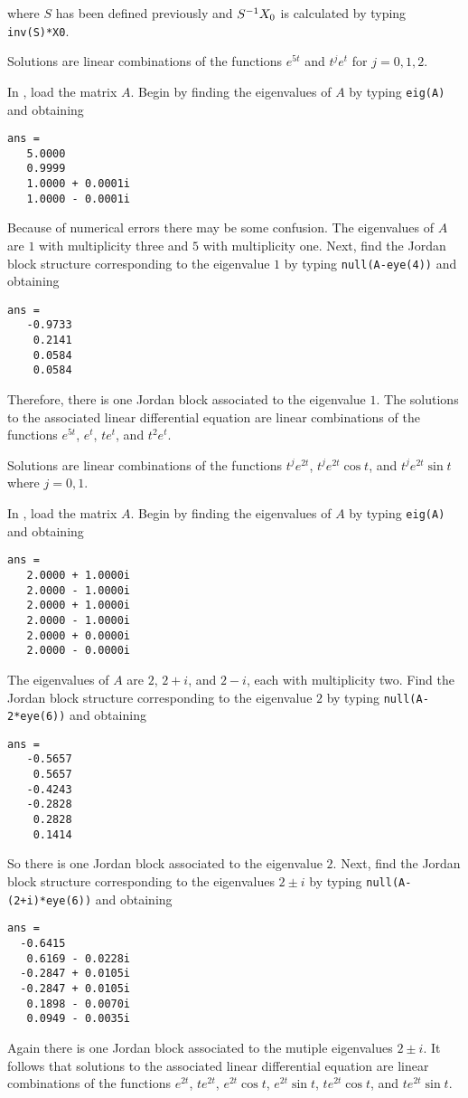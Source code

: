 where $S$ has been defined previously and $S^{-1} X_0$ is calculated by typing 
{\tt inv(S)*X0}.


 \ans Solutions are linear combinations of the functions 
$e^{5t}$ and $t^je^t$ for $j=0,1,2$.

\soln In \Matlabp, load the matrix $A$.  Begin by 
finding the eigenvalues of $A$ by typing {\tt eig(A)} and obtaining
\begin{verbatim}
ans =
   5.0000          
   0.9999          
   1.0000 + 0.0001i
   1.0000 - 0.0001i
\end{verbatim}
Because of numerical errors there may be some confusion.  The eigenvalues of
$A$ are $1$ with multiplicity three and $5$ with multiplicity one.  Next,
find the Jordan block structure corresponding to the eigenvalue $1$ by typing
{\tt null(A-eye(4))} and obtaining
\begin{verbatim}
ans =
   -0.9733
    0.2141
    0.0584
    0.0584
\end{verbatim}
Therefore, there is one Jordan block associated to the eigenvalue $1$.  The
solutions to the associated linear differential equation are linear
combinations of the functions $e^{5t}$, $e^t$, $te^t$, and $t^2e^t$.


 \ans Solutions are linear combinations of the functions 
$t^je^{2t}$, $t^je^{2t}\cos t$, and $t^je^{2t}\sin t$ where $j=0,1$.

\soln In \Matlabp, load the matrix $A$.  Begin by 
finding the eigenvalues of $A$ by typing {\tt eig(A)} and obtaining
\begin{verbatim}
ans =
   2.0000 + 1.0000i
   2.0000 - 1.0000i
   2.0000 + 1.0000i
   2.0000 - 1.0000i
   2.0000 + 0.0000i
   2.0000 - 0.0000i
\end{verbatim}
The eigenvalues of $A$ are $2$, $2+i$, and $2-i$, each with multiplicity two.
Find the Jordan block structure corresponding to the eigenvalue $2$ by typing
{\tt null(A-2*eye(6))} and obtaining
\begin{verbatim}
ans =
   -0.5657
    0.5657
   -0.4243
   -0.2828
    0.2828
    0.1414
\end{verbatim}
So there is one Jordan block associated to the eigenvalue $2$.  Next, 
find the Jordan block structure corresponding to the eigenvalues $2\pm i$ by 
typing {\tt null(A-(2+i)*eye(6))} and obtaining
\begin{verbatim}
ans =
  -0.6415          
   0.6169 - 0.0228i
  -0.2847 + 0.0105i
  -0.2847 + 0.0105i
   0.1898 - 0.0070i
   0.0949 - 0.0035i
\end{verbatim}
Again there is one Jordan block associated to the mutiple eigenvalues 
$2\pm i$.  It follows that solutions to the associated linear differential 
equation are linear combinations of the functions $e^{2t}$, $te^{2t}$, 
$e^{2t}\cos t$, $e^{2t}\sin t$, $te^{2t}\cos t$, and $te^{2t}\sin t$.



